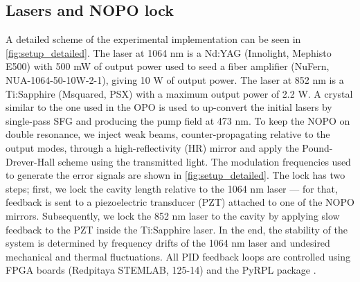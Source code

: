 \documentclass[final,twocolumn,english,prl,notitlepage,nofootinbib,floatfix,longbibliography,superscriptaddress
]{revtex4-2}
\begin{document}
\subsection*{Lasers and NOPO lock}
A detailed scheme of the experimental implementation can be seen in \ref{fig:setup_detailed}. The laser at 1064 nm is a Nd:YAG (Innolight, Mephisto E500) with 500 mW of output power used to seed a fiber amplifier (NuFern, NUA-1064-50-10W-2-1), giving 10 W of output power. The laser at 852 nm is a Ti:Sapphire (Msquared,  PSX) with a maximum output power of 2.2 W. A crystal similar to the one used in the OPO is used to up-convert the initial lasers by single-pass SFG and producing the pump field at 473 nm. To keep the NOPO on double resonance, we inject weak beams,  counter-propagating relative to the output modes, through a high-reflectivity (HR) mirror and apply the Pound-Drever-Hall scheme using the transmitted light. The modulation frequencies used to generate the error signals are shown in \ref{fig:setup_detailed}.  The lock has two steps; first, we lock the cavity length relative to the 1064 nm laser --- for that, feedback is sent to a piezoelectric transducer (PZT) attached to one of the NOPO mirrors. Subsequently, we lock the 852 nm laser to the cavity by applying slow feedback to the PZT inside the Ti:Sapphire laser. In the end, the stability of the system is determined by frequency drifts of the 1064 nm laser and undesired mechanical and thermal fluctuations. All  PID feedback loops are controlled using FPGA boards (Redpitaya STEMLAB, 125-14) and the PyRPL package \cite{Neuhaus2017}.\par
\end{document}

